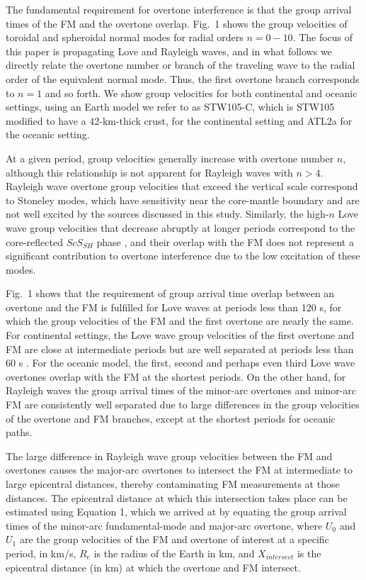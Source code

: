 \documentclass[extra,mreferee]{gji}
\begin{document}
 The fundamental requirement for overtone interference is that the group arrival times of the FM and the overtone overlap. Fig.\ 1 shows the group velocities of toroidal and spheroidal normal modes for radial orders $n=0-10$. The focus of this paper is propagating Love and Rayleigh waves, and in what follows we directly relate the overtone number or branch of the traveling wave to the radial order of the equivalent normal mode. Thus, the first overtone branch corresponds to $n=1$ and so forth. We show group velocities for both continental and oceanic settings, using an Earth model we refer to as STW105-C, which is STW105 \citep{kustowski2008anisotropic} modified to have a 42-km-thick crust, for the continental setting and ATL2a \citep{james2014rayleigh} for the oceanic setting. 

At a given period, group velocities generally increase with  overtone number $n$, although this relationship is not apparent for Rayleigh waves with $n > 4$.  Rayleigh wave overtone group velocities that exceed the vertical scale correspond to Stoneley modes, which have sensitivity near the core-mantle boundary and are not well excited by the sources discussed in this study. Similarly, the high-$n$ Love wave group velocities that decrease abruptly at longer periods correspond to the core-reflected $ScS_{SH}$ phase \citep{dahlen1998theoretical}, and their overlap with the FM does not represent a significant contribution to overtone interference due to the low excitation of these modes.

Fig.\ 1 shows that the requirement of group arrival time overlap between an overtone and the FM is fulfilled for Love waves at periods less than 120 s, for which the group velocities of the FM and the first overtone are nearly the same. For continental settings, the Love wave group velocities of the first overtone and FM are close at intermediate periods but are well separated at periods less than 60 s \citep{nettles2011effect}. For the oceanic model, the first, second and perhaps even third Love wave overtones overlap with the FM at the shortest periods. On the other hand, for Rayleigh waves the group arrival times of the minor-arc overtones and minor-arc FM are consistently well separated due to large differences in the group velocities of the overtone and FM branches, except at the shortest periods for oceanic paths.

The large difference in Rayleigh wave group velocities between the FM and overtones causes the major-arc overtones to intersect the FM at intermediate to large epicentral distances, thereby contaminating FM measurements at those distances. The epicentral distance at which this intersection takes place can be estimated using Equation 1,  which we arrived at by equating the group arrival times of the minor-arc fundamental-mode and major-arc overtone, where $U_{0}$ and $U_{1}$ are the group velocities of the FM and overtone of interest at a specific period, in km/s, $R_e$ is the radius of the Earth in km, and $X_{intersect}$ is the epicentral distance (in km) at which the overtone and FM intersect.
\end{document}
